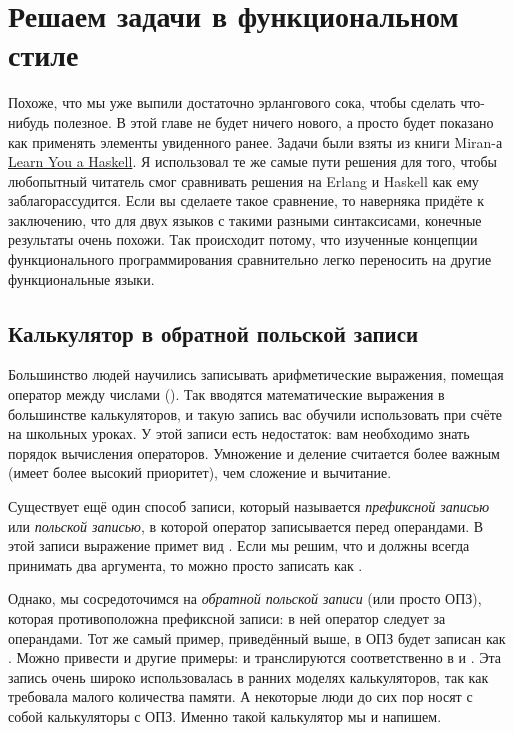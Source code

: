\chapter{Решаем задачи в функциональном стиле}
\label{functionally-solving-problems}
\colorbox{lgray}
{
\begin{minipage}{1.0\linewidth}
    Похоже, что мы уже выпили достаточно эрлангового сока, чтобы сделать что\--нибудь полезное.
    В этой главе не будет ничего нового, а просто будет показано как применять элементы увиденного ранее.
    Задачи были взяты из книги Miran\--а \href{http://learnyouahaskell.com/functionally-solving-problems}{Learn You a Haskell}.
    Я использовал те же самые пути решения для того, чтобы любопытный читатель смог сравнивать решения на Erlang и Haskell как ему заблагорассудится.
    Если вы сделаете такое сравнение, то наверняка придёте к заключению, что для двух языков с такими разными синтаксисами, конечные результаты очень похожи.
    Так происходит потому, что изученные концепции функционального программирования сравнительно  легко переносить на другие функциональные языки.
\end{minipage}
}
\section{Калькулятор в обратной польской записи}
\label{reverse-polish-notation-calculator}
Большинство людей научились записывать арифметические выражения, помещая оператор между числами ().
Так вводятся математические выражения в большинстве калькуляторов, и такую запись вас обучили использовать при счёте на школьных уроках. 
У этой записи есть недостаток: вам необходимо знать порядок вычисления операторов.
Умножение и деление считается более важным (имеет более высокий приоритет), чем сложение и вычитание.

Существует ещё один способ записи, который называется \emph{префиксной записью} или \emph{польской записью}, в которой оператор записывается перед операндами.
В этой записи выражение  примет вид .
Если мы решим, что \ops{+\strut}  и \ops{/\strut} должны всегда принимать два аргумента, то  можно просто записать как .

Однако, мы сосредоточимся на \emph{обратной польской записи} (или просто ОПЗ), которая противоположна префиксной записи: в ней оператор следует за операндами.
Тот же самый пример, приведённый выше, в ОПЗ будет записан как .
Можно привести и другие примеры:  и  транслируются соответственно в  и .
Эта запись очень широко использовалась в ранних моделях калькуляторов, так как требовала малого количества памяти.
А некоторые люди до сих пор носят с собой калькуляторы с ОПЗ.
Именно такой калькулятор мы и напишем.


